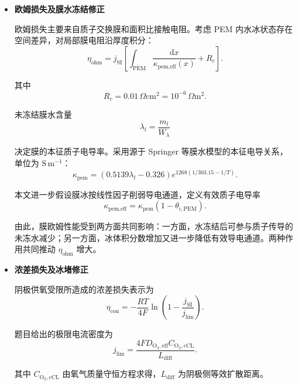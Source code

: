 \documentclass[bwprint]{gmcmthesis}
\numberwithin{equation}{section}
\numberwithin{figure}{section}
\begin{document}
\begin{itemize}
 随着冰在 cCL 中累积，\(f_a\) 减小，进而使 \(j_{0,\text{eff}}\) 下降；在相同外部电流密度下，所需活化过电位随之增加。因此，\eqref{eq:src:4-75}给出了“冰覆盖—有效反应面积减少—活化损失增加”的定量表达。


\item \textbf {欧姆损失及膜水冻结修正}

 欧姆损失主要来自质子交换膜和面积比接触电阻。考虑 PEM 内水冰状态存在空间差异，对局部膜电阻沿厚度积分：
\begin{equation}
\eta_{\text{ohm}} = j_{\mathrm{SI}} \left[ \int_{\text{PEM}} \frac{\mathrm{d}x}{\kappa_{\text{pem,eff}}(x)} + R_c \right]. \label{eq:src:4-76}
\end{equation}

 其中
\[
R_c = 0.01 \, \Omega\text{cm}^2 = 10^{-6} \, \Omega\text{m}^2.
\]

 未冻结膜水含量
\[
\lambda_l = \frac{m_l}{W_\lambda}
\]

 决定膜的本征质子电导率。采用源于 Springer 等膜水模型的本征电导关系\cite{springer1991}，单位为 $\mathrm{S\,m^{-1}}$：
\begin{equation}
\kappa_{\text{pem}} = (0.5139\lambda_l - 0.326)e^{1268(1/303.15 - 1/T)}. \label{eq:src:4-77}
\end{equation}

 本文进一步假设膜冰按线性因子削弱导电通道，定义有效质子电导率
\begin{equation}
\kappa_{\text{pem,eff}} = \kappa_{\text{pem}}(1 - \theta_{i,\text{PEM}}). \label{eq:src:4-78}
\end{equation}

 由此，膜欧姆性能受到两方面共同影响：一方面，水冻结后可参与质子传导的未冻水减少；另一方面，冰体积分数增加又进一步降低有效导电通道。两种作用共同推动 \(\eta_{\text{ohm}}\) 增大。


\item \textbf {浓差损失及冰堵修正}

 阴极供氧受限所造成的浓差损失表示为
\begin{equation}
\eta_{\text{con}} = -\frac{RT}{4F} \ln \left( 1 - \frac{j_{\mathrm{SI}}}{j_{\text{lim}}} \right). \label{eq:src:4-79}
\end{equation}

 题目给出的极限电流密度为
\begin{equation}
j_{\text{lim}} = \frac{4 F D_{\text{O}_2,\text{eff}} C_{\text{O}_2,\text{cCL}}}{L_{\text{diff}}}. \label{eq:src:4-80}
\end{equation}

 其中 \(C_{\text{O}_2,\text{cCL}}\) 由氧气质量守恒方程求得，\(L_{\text{diff}}\) 为阴极侧等效扩散距离。


\end{itemize}
\end{document}
